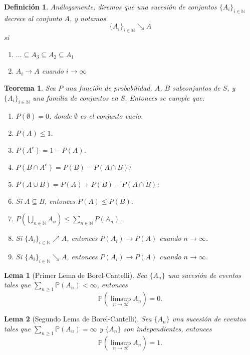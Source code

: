 \documentclass{report}
\newtheorem{thm}{Teorema}[section]
\newtheorem{lem}{Lema}[section]
\newtheorem{dfn}{Definición}[section]
\begin{document}
\begin{dfn}
Análogamente, diremos que una sucesión de conjuntos $\{A_i\}_{i\in\mathbb{N}}$ \emph{decrece} al conjunto $A$, y notamos
$$
\{A_i\}_{i\in\mathbb{N}}\searrow A
$$
si
\begin{enumerate}
    \item $\ldots \subseteq A_3 \subseteq A_2 \subseteq A_1 $
    \item $A_i \rightarrow A$ cuando $i\rightarrow \infty$
\end{enumerate}
\end{dfn}

\begin{thm}
Sea \( P \) una función de probabilidad, $A$, $B$ subconjuntos de \(S\), y $\{A_i\}_{i\in\mathbb{N}}$ una familia de conjuntos en $S$. 
Entonces se cumple que:

\begin{enumerate}
    \item \( P(\emptyset) = 0 \), donde \( \emptyset \) es el conjunto vacío.
    \item \( P(A) \leq 1 \).
    \item \( P(A^c) = 1 - P(A) \).
    \item \( P(B \cap A^c) = P(B) - P(A \cap B) \);
    \item \( P(A \cup B) = P(A) + P(B) - P(A \cap B) \);
    \item Si \( A \subseteq B \), entonces \( P(A) \leq P(B) \).
    \item $P\left(\bigcup_{n\in\mathbb{N}}A_n\right) \leq \sum_{n\in\mathbb{N}}P(A_n)$.
    \item Si $\{A_i\}_{i\in\mathbb{N}}\nearrow A$, entonces $P(A_i)\rightarrow P(A)$ cuando $n\rightarrow \infty$.
    \item Si $\{A_i\}_{i\in\mathbb{N}}\searrow A$, entonces $P(A_i)\rightarrow P(A)$ cuando $n\rightarrow \infty$.
\end{enumerate}
\end{thm}

\begin{lem}[Primer Lema de Borel-Cantelli]
Sea \( \{A_n\} \) una sucesión de eventos tales que \( \sum_{n \geq 1} \mathbb{P}(A_n) < \infty \), entonces
\[
\mathbb{P} \left( \limsup_{n \to \infty} A_n \right) = 0.
\]
\end{lem}

\begin{lem}[Segundo Lema de Borel-Cantelli]
Sea \( \{A_n\} \) una sucesión de eventos tales que \( \sum_{n \geq 1} \mathbb{P}(A_n) = \infty \) y \( \{A_n\} \) son independientes, entonces
\[
\mathbb{P} \left( \limsup_{n \to \infty} A_n \right) = 1.
\]
\end{lem}
\end{document}
